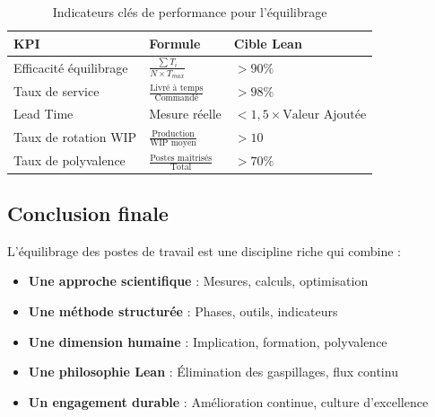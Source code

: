 \documentclass[12pt,a4paper]{article}
\begin{document}
\begin{center}
\begin{table}[H]
\centering
\begin{tabular}{|p{4cm}|p{4cm}|p{4cm}|}
\hline
\textbf{KPI} & \textbf{Formule} & \textbf{Cible Lean} \\
\hline
Efficacité équilibrage & $\frac{\sum T_i}{N \times T_{max}}$ & $> 90\%$ \\
\hline
Taux de service & $\frac{\text{Livré à temps}}{\text{Commandé}}$ & $> 98\%$ \\
\hline
Lead Time & Mesure réelle & $< 1,5 \times \text{Valeur Ajoutée}$ \\
\hline
Taux de rotation WIP & $\frac{\text{Production}}{\text{WIP moyen}}$ & $> 10$ \\
\hline
Taux de polyvalence & $\frac{\text{Postes maîtrisés}}{\text{Total}}$ & $> 70\%$ \\
\hline
\end{tabular}
\caption{Indicateurs clés de performance pour l'équilibrage}
\end{table}

\subsection{Conclusion finale}

L'équilibrage des postes de travail est une discipline riche qui combine :

\begin{itemize}
    \item \textbf{Une approche scientifique} : Mesures, calculs, optimisation
    \item \textbf{Une méthode structurée} : Phases, outils, indicateurs
    \item \textbf{Une dimension humaine} : Implication, formation, polyvalence
    \item \textbf{Une philosophie Lean} : Élimination des gaspillages, flux continu
    \item \textbf{Un engagement durable} : Amélioration continue, culture d'excellence
\end{itemize}

\begin{center}
\end{center}


\end{center}
\end{document}
